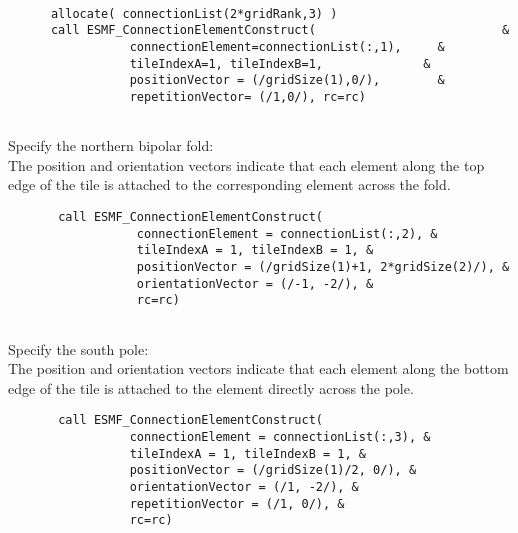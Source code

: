  \begin{verbatim}

      allocate( connectionList(2*gridRank,3) )
      call ESMF_ConnectionElementConstruct(                          &
                 connectionElement=connectionList(:,1),     &
                 tileIndexA=1, tileIndexB=1,              &
                 positionVector = (/gridSize(1),0/),        &
                 repetitionVector= (/1,0/), rc=rc)
 
\end{verbatim}
 

   Specify the northern bipolar fold: \\
  
    The position and orientation vectors indicate that each element 
    along the top edge of the tile is attached to the corresponding
    element across the fold.  

 \begin{verbatim}
       call ESMF_ConnectionElementConstruct(
                  connectionElement = connectionList(:,2), &
                  tileIndexA = 1, tileIndexB = 1, &
                  positionVector = (/gridSize(1)+1, 2*gridSize(2)/), &
                  orientationVector = (/-1, -2/), &
                  rc=rc)
 
\end{verbatim}
 

   Specify the south pole: \\
  
    The position and orientation vectors indicate that each element along
     the bottom edge of the tile is attached to the element directly across the pole.  

 \begin{verbatim}
       call ESMF_ConnectionElementConstruct( 
                 connectionElement = connectionList(:,3), &
                 tileIndexA = 1, tileIndexB = 1, &
                 positionVector = (/gridSize(1)/2, 0/), &
                 orientationVector = (/1, -2/), &
                 repetitionVector = (/1, 0/), &
                 rc=rc)
 
\end{verbatim}
 
